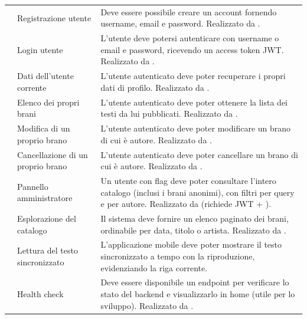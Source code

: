\begin{longtable}{@{}p{1.2cm}p{4.5cm}Y@{}}
 & Registrazione utente &
Deve essere possibile creare un account fornendo username, email e
password. Realizzato da . \\

 & Login utente &
L'utente deve potersi autenticare con username o email e password,
ricevendo un access token JWT. Realizzato da
. \\

 & Dati dell'utente corrente &
L'utente autenticato deve poter recuperare i propri dati di profilo.
Realizzato da . \\

 & Elenco dei propri brani &
L'utente autenticato deve poter ottenere la lista dei testi da lui
pubblicati. Realizzato da . \\

 & Modifica di un proprio brano &
L'utente autenticato deve poter modificare un brano di cui è autore.
Realizzato da . \\

 & Cancellazione di un proprio brano &
L'utente autenticato deve poter cancellare un brano di cui è autore.
Realizzato da . \\

 & Pannello amministratore &
Un utente con flag  deve poter consultare l'intero
catalogo (inclusi i brani anonimi), con filtri per query e per
autore. Realizzato da 
(richiede JWT + ). \\

 & Esplorazione del catalogo &
Il sistema deve fornire un elenco paginato dei brani, ordinabile per
data, titolo o artista. Realizzato da . \\

 & Lettura del testo sincronizzato &
L'applicazione mobile deve poter mostrare il testo sincronizzato a tempo
con la riproduzione, evidenziando la riga corrente. \\

 & Health check &
Deve essere disponibile un endpoint per verificare lo stato del backend
e visualizzarlo in home (utile per lo sviluppo).
Realizzato da . \\

\bottomrule
\end{longtable}

